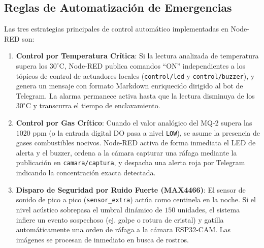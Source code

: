 \documentclass[12pt,letterpaper]{article}
\begin{document}
\subsection{Reglas de Automatización de Emergencias}
Las tres estrategias principales de control automático implementadas en Node-RED son:
\begin{enumerate}
    \item \textbf{Control por Temperatura Crítica}: Si la lectura analizada de temperatura supera los $30^{\circ}\text{C}$, Node-RED publica comandos ``ON'' independientes a los tópicos de control de actuadores locales (\texttt{control/led} y \texttt{control/buzzer}), y genera un mensaje con formato Markdown enriquecido dirigido al bot de Telegram. La alarma permanece activa hasta que la lectura disminuya de los $30^{\circ}\text{C}$ y transcurra el tiempo de enclavamiento.
    \item \textbf{Control por Gas Crítico}: Cuando el valor analógico del MQ-2 supera las $1020$ ppm (o la entrada digital DO pasa a nivel \texttt{LOW}), se asume la presencia de gases combustibles nocivos. Node-RED activa de forma inmediata el LED de alerta y el buzzer, ordena a la cámara capturar una ráfaga mediante la publicación en \texttt{camara/captura}, y despacha una alerta roja por Telegram indicando la concentración exacta detectada.
    \item \textbf{Disparo de Seguridad por Ruido Fuerte (MAX4466)}: El sensor de sonido de pico a pico (\texttt{sensor\_extra}) actúa como centinela en la noche. Si el nivel acústico sobrepasa el umbral dinámico de $150$ unidades, el sistema infiere un evento sospechoso (ej. golpe o rotura de cristal) y gatilla automáticamente una orden de ráfaga a la cámara ESP32-CAM. Las imágenes se procesan de inmediato en busca de rostros.
\end{enumerate}
\end{document}
